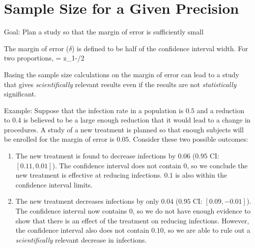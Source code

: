\section{Sample Size for a Given Precision}

\bi
 \item Goal: Plan a study so that the margin of error is sufficiently small
 \item The margin of error ($\delta$) is defined to be half of the confidence interval width.  For two proportions,
  \beq
  \delta = z_{1-\alpha/2} \times{}
  \eeq
 \item Basing the sample size calculations on the margin of error can lead to a study that gives \textit{scientifically} relevant results even if the results are not \textit{statistically} significant.
  \item Example: Suppose that the infection rate in a population is $0.5$ and a reduction to $0.4$ is believed to be a large enough reduction that it would lead to a change in procedures.  A study of a new treatment is planned so that enough subjects will be enrolled for the margin of error is $0.05$.  Consider these two possible outcomes:
  \begin{enumerate}
  \item The new treatment is found to decrease infections by $0.06$ ($0.95$ CI: $[0.11, 0.01]$).  The confidence interval does not contain $0$, so we conclude the new treatment is effective at reducing infections.  $0.1$ is also within the confidence interval limits.
  \item The new treatment decreases infections by only $0.04$ ($0.95$ CI: $[0.09, -0.01]$).  The confidence interval now contains $0$, so we do not have enough evidence to show that there is an effect of the treatment on reducing infections. However, the confidence interval also does not contain $0.10$, so we are able to rule out a \textit{scientifically} relevant decrease in infections.
  \end{enumerate}


